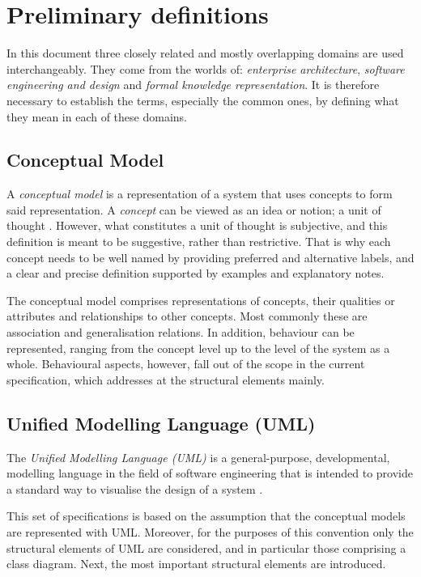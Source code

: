 \section{Preliminary definitions}
	\label{sec:definitions}

	In this document three closely related and mostly overlapping domains are used interchangeably. They come from the worlds of: \textit{enterprise architecture}, \textit{software engineering and design} and \textit{formal knowledge representation}. It is therefore necessary to establish the terms, especially the common ones, by defining what they mean in each of these domains. 

	\subsection{Conceptual Model}
	\label{sec:cm}
	
	A \textit{conceptual model} is a representation of a system that uses concepts to form said representation. A \textit{concept} can be viewed as an idea or notion; a unit of thought \cite{skos-spec}. However, what constitutes a unit of thought is subjective, and this definition is meant to be suggestive, rather than restrictive. That is why each concept needs to be well named by providing preferred and alternative labels, and a clear and precise definition supported by examples and explanatory notes.
	
	The conceptual model comprises representations of concepts, their qualities or attributes and relationships to other concepts. Most commonly these are association and generalisation relations. In addition, behaviour can be represented, ranging from the concept level up to the level of the system as a whole. Behavioural aspects, however, fall out of the scope in the current specification, which addresses at the structural elements mainly.

	\subsection{Unified Modelling Language (UML)}
	\label{sec:uml}
	
	The \textit{Unified Modelling Language (UML)} is a general-purpose, developmental, modelling language in the field of software engineering that is intended to provide a standard way to visualise the design of a system \cite{uml-userguide}.
	
	This set of specifications is based on the assumption that the conceptual models are represented with UML. Moreover, for the purposes of this convention only the structural elements of UML are considered, and in particular those comprising a class diagram. Next, the most important structural elements are introduced.
	
